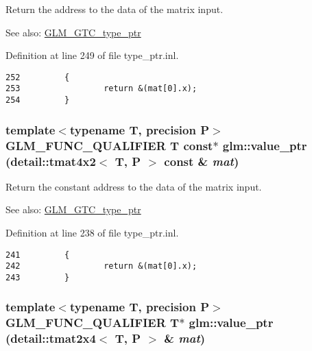 Return the address to the data of the matrix input. \begin{Desc}
\item[See also:]\hyperlink{group__gtc__type__ptr}{GLM\_\-GTC\_\-type\_\-ptr} \end{Desc}


Definition at line 249 of file type\_\-ptr.inl.

\begin{Code}\begin{verbatim}252         {
253                 return &(mat[0].x);
254         }
\end{verbatim}
\end{Code}


\hypertarget{group__gtc__type__ptr_g548aa4697fc58fdd3d33df6c57777191}{
\subsubsection[value\_\-ptr]{\setlength{\rightskip}{0pt plus 5cm}template$<$typename T, precision P$>$ GLM\_\-FUNC\_\-QUALIFIER T const$\ast$ glm::value\_\-ptr (detail::tmat4x2$<$ T, P $>$ const \& {\em mat})}}
\label{group__gtc__type__ptr_g548aa4697fc58fdd3d33df6c57777191}


Return the constant address to the data of the matrix input. \begin{Desc}
\item[See also:]\hyperlink{group__gtc__type__ptr}{GLM\_\-GTC\_\-type\_\-ptr} \end{Desc}


Definition at line 238 of file type\_\-ptr.inl.

\begin{Code}\begin{verbatim}241         {
242                 return &(mat[0].x);
243         }
\end{verbatim}
\end{Code}


\hypertarget{group__gtc__type__ptr_g998aae25d0d9de346b951148c61e930e}{
\subsubsection[value\_\-ptr]{\setlength{\rightskip}{0pt plus 5cm}template$<$typename T, precision P$>$ GLM\_\-FUNC\_\-QUALIFIER T$\ast$ glm::value\_\-ptr (detail::tmat2x4$<$ T, P $>$ \& {\em mat})}}
\label{group__gtc__type__ptr_g998aae25d0d9de346b951148c61e930e}


